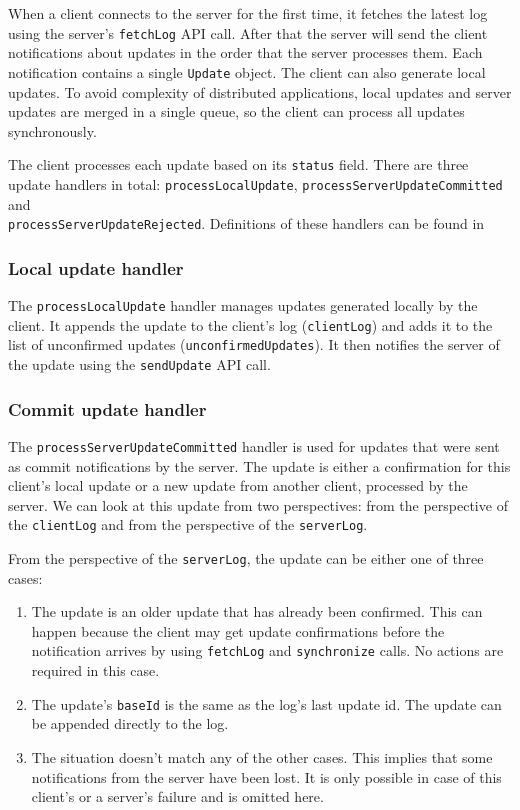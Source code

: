 \documentclass[a4paper, 11pt, oneside]{article}
\theoremstyle{definition}
\begin{document}
When a client connects to the server for the first time, it fetches the latest log using the server's \verb|fetchLog| API call. After that the server will send the client notifications about updates in the order that the server processes them. Each notification contains a single \verb|Update| object. The client can also generate local updates. To avoid complexity of distributed applications, local updates and server updates are merged in a single queue, so the client can process all updates synchronously.

The client processes each update based on its \verb|status| field. There are three update handlers in total: \verb|processLocalUpdate|, \verb|processServerUpdateCommitted| and \\ \verb|processServerUpdateRejected|. Definitions of these handlers can be found in 

\subsubsection*{Local update handler}

The \verb|processLocalUpdate| handler manages updates generated locally by the client. It appends the update to the client's log (\verb|clientLog|) and adds it to the list of unconfirmed updates (\verb|unconfirmedUpdates|). It then notifies the server of the update using the \verb|sendUpdate| API call.

\subsubsection*{Commit update handler}

The \verb|processServerUpdateCommitted| handler is used for updates that were sent as commit notifications by the server. The update is either a confirmation for this client's local update or a new update from another client, processed by the server. We can look at this update from two perspectives: from the perspective of the \verb|clientLog| and from the perspective of the \verb|serverLog|.

From the perspective of the \verb|serverLog|, the update can be either one of three cases:

\begin{enumerate}
    \item The update is an older update that has already been confirmed. This can happen because the client may get update confirmations before the notification arrives by using \verb|fetchLog| and \verb|synchronize| calls. No actions are required in this case.
    \item The update's \verb|baseId| is the same as the log's last update id. The update can be appended directly to the log.
    \item The situation doesn't match any of the other cases. This implies that some notifications from the server have been lost. It is only possible in case of this client's or a server's failure and is omitted here.
\end{enumerate}
\end{document}
